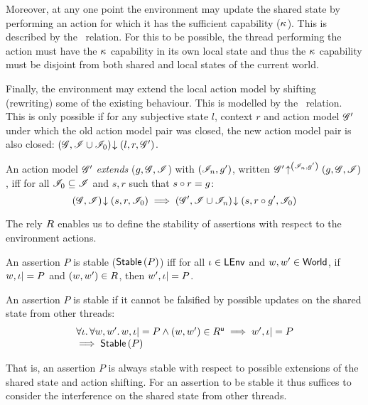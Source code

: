 Moreover, at any one point the environment may update the shared state by performing an action for which it has the sufficient capability ($\kappa_{}$). This is described by the \updateR\ relation. For this to be possible, the thread performing the action must have the $\kappa_{}$ capability in its own local state and thus the $\kappa_{}$ capability must be disjoint from both shared and local states of the current world. 

Finally, the environment may extend the local action model by shifting (rewriting) some of the existing behaviour. This is modelled by the \shiftR\ relation. This is only possible if for any subjective state $l$, context $r$ and action model $\mathscr{G}'$ under which the old action model pair was closed, the new action model pair is also closed: $\left(\mathscr{G}, \mathscr{I} \cup \mathscr{I}_0\right) \!\downarrow \left(l, r, \mathscr{G}'\right)$. 
%
%
\begin{definition}\label{def:amodExtension}
An action model $\mathscr{G}'$ \emph{extends}  ($g, \mathscr{G}, \mathscr{I}$) with $(\mathscr{I}_n, g')$, written $\mathscr{G}' \!\uparrow^{\left(\mathscr{I}_n, g'\right)} \left(g, \mathscr{G}, \mathscr{I}\right)$, iff for all $\mathscr{I}_0 \subseteq \mathscr{I}$ and $s, r$ such that $s \circ r = g$:
%
\[
	\left(\mathscr{G}, \mathscr{I}\right) \!\downarrow \left(s, r, \mathscr{I}_0\right) \implies \left(\mathscr{G}', \mathscr{I} \cup \mathscr{I}_n\right) \!\downarrow \left(s, r\circ g', \mathscr{I}_0\right)
\]
%
\end{definition}
%
%
The rely $R$ enables us to define the stability of assertions with respect to the environment actions.
%
\begin{definition}[Stability] An assertion $P$ is stable ($\textsf{Stable}\left(P\right)$) iff for all $\iota \in \textsf{LEnv}$ and $w, w' \in \textsf{World}$, if $w, \iota |= P$ and $(w, w') \in R$, then $w', \iota |= P$.
\end{definition}
%
\begin{lemma}[Stability]
An assertion $P$ is stable if it cannot be falsified by possible updates on the shared state from other threads:
%
\[
\begin{array}{l}
	\forall \iota.\,\forall w, w'.\, 
    w, \iota |= P \land (w, w') \in R^{\textsf{u}} \implies
	 	w', \iota |= P\\
	 
	 \implies \textsf{Stable}\left(P\right)
\end{array}	 
\]
%
\end{lemma}
%
That is, an assertion $P$ is always stable with respect to possible extensions of the shared state and action shifting. For an assertion to be stable it thus suffices to consider the interference on the shared state from other threads.

